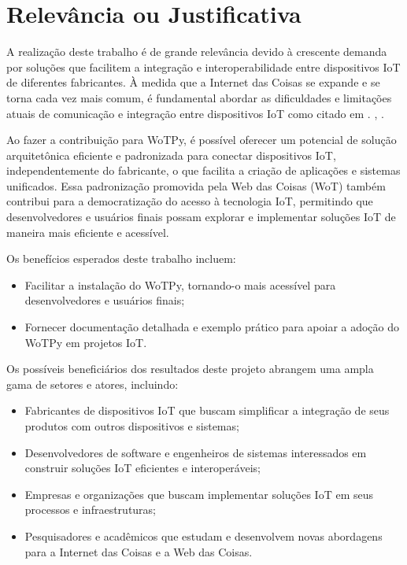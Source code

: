 \chapter{Relevância ou Justificativa}


A realização deste trabalho é de grande relevância devido à crescente demanda por soluções que facilitem a integração e interoperabilidade entre dispositivos IoT de diferentes fabricantes. À medida que a Internet das Coisas se expande e se torna cada vez mais comum, é fundamental abordar as dificuldades e limitações atuais de comunicação e integração entre dispositivos IoT como citado em \cite{Stirbu2008} \cite{Gyrard2017}. \cite{GARCIAMANGAS2019235}, \cite{OpenApíWoT2021}.

Ao fazer a contribuição para WoTPy, é possível oferecer um potencial de solução arquitetônica eficiente e padronizada para conectar dispositivos IoT, independentemente do fabricante, o que facilita a criação de aplicações e sistemas unificados. Essa padronização promovida pela Web das Coisas (WoT) também contribui para a democratização do acesso à tecnologia IoT, permitindo que desenvolvedores e usuários finais possam explorar e implementar soluções IoT de maneira mais eficiente e acessível.

Os benefícios esperados deste trabalho incluem:

\begin{itemize}
    \item Facilitar a instalação do WoTPy, tornando-o mais acessível para desenvolvedores e usuários finais;
    \item Fornecer documentação detalhada e exemplo prático para apoiar a adoção do WoTPy em projetos IoT.
\end{itemize}

Os possíveis beneficiários dos resultados deste projeto abrangem uma ampla gama de setores e atores, incluindo:

\begin{itemize}
    \item Fabricantes de dispositivos IoT que buscam simplificar a integração de seus produtos com outros dispositivos e sistemas;
    \item Desenvolvedores de software e engenheiros de sistemas interessados em construir soluções IoT eficientes e interoperáveis;
    \item Empresas e organizações que buscam implementar soluções IoT em seus processos e infraestruturas;
    \item Pesquisadores e acadêmicos que estudam e desenvolvem novas abordagens para a Internet das Coisas e a Web das Coisas.
\end{itemize}

